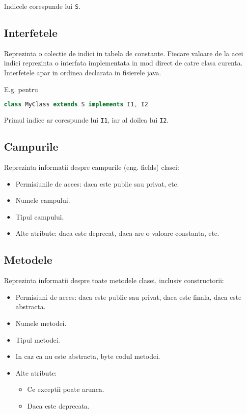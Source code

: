 Indicele corespunde lui \texttt{S}.

\subsection{Interfetele}

Reprezinta o colectie de indici in tabela de constante. Fiecare valoare
de la acei indici reprezinta o interfata implementata in mod direct de
catre clasa curenta. Interfetele apar in ordinea declarata in fisierele
java.

E.g. pentru

\begin{lstlisting}[language=Java]
class MyClass extends S implements I1, I2
\end{lstlisting}

Primul indice ar corespunde lui \texttt{I1}, iar al doilea lui
\texttt{I2}.

\subsection{Campurile}\label{campurile}

Reprezinta informatii despre campurile (eng. fields) clasei:
\begin{itemize}
    \item Permisiunile de acces: daca este public sau privat, etc.
    \item Numele campului.
    \item Tipul campului.
    \item Alte atribute: daca este deprecat, daca are o valoare constanta, etc.
\end{itemize}

\subsection{Metodele}\label{metodele}

Reprezinta informatii despre toate metodele clasei, inclusiv
constructorii:

\begin{itemize}
    \item Permisiuni de acces: daca este public sau privat, daca este finala, daca este abstracta.
    \item Numele metodei.
    \item Tipul metodei.
    \item In caz ca nu este abstracta, byte codul metodei.
    \item Alte atribute:
        \begin{itemize}
            \item Ce exceptii poate arunca.
            \item Daca este deprecata.
        \end{itemize}
\end{itemize}

